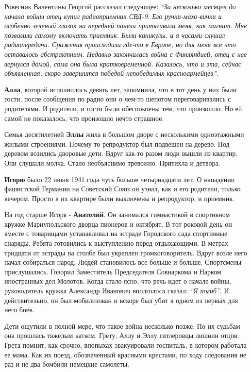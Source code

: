 Ровесник Валентины Георгий рассказал следующее: \emph{\enquote{За несколько месяцев до начала
войны отец купил радиоприемник СВД-9. Его ручки-махо\hyp{}вички и особенно зеленый
глазок на передней панели притягивали меня, как магнит. Мне позволили самому
включать приемник. Были каникулы, и я часами слушал радиопередачи. Сражения
происходили где-то в Европе, но для меня все это оставалось абстрактным.
Недавно закончилась война с Финляндией, отец с нее вернулся домой, сама она
была кратковременной. Казалось, что и эта, сейчас объявленная, скоро завершится
победой непобедимых красноармейцев}}.

\textbf{Алла}, которой исполнилось девять лет, запомнила, что в тот день у них были
гости, после сообщения по радио они о чем-то шепотом переговаривались с
родителями. И родители, и гости были обеспокоены тем, что произошло. Но ей
самой не показалось, что произошло нечто страшное.

Семья десятилетней \textbf{Эллы} жила в большом дворе с несколькими одноэтажными жилыми
строениями. Почему-то репродуктор был подвешен на дерево. Под деревом возились
дворовые дети. Вдруг как-то разом люди вышли из квартир. Они слушали молча.
Стало необъяснимо тревожно. Притихла и детвора.

\textbf{Игорю} было 22 июня 1941 года чуть больше четырнадцати лет. О нападении
фашистской Германии на Советский Союз он узнал, как и его родители, только
вечером. Просто в их квартире были выключены и репродуктор, и приемник. 

На год старше Игоря - \textbf{Анатолий}. Он занимался гимнастикой в спортивном кружке
Мариупольского дворца пионеров и октябрят. В тот роковой день он вместе с
товарищами устанавливал на эстраде Городского сада спортивные снаряды. Ребята
готовились к выступлению перед отдыхающими. В метрах тридцати от эстрады на
столбе был укреплен громкоговоритель. Вдруг возле него начал собираться народ.
Людей становилось все больше и больше. Спортсмены прислушались. Говорил
Заместитель Председателя Совнаркома и Нарком иностранных дел Молотов. Когда
стало ясно, что речь идет о начале войны, руководитель кружка Александр
Иванович вполголоса сказал: \emph{\enquote{Я погиб}}. И действительно, он был мобилизован и
вскоре был убит в одном из первых для него боев.

Дети ощутили в полной мере, что такое война несколько позже. По их судьбам она
прошлась тяжелым катком. Грету, Аллу и Эллу гитлеровцы лишили отцов. Грета
помнит, как срочно, впопыхах эвакуировали госпиталь, в котором работала ее
мама. Как их поезд, обозначенный красными крестами, по ходу следования не раз и
не два бомбили немецкие самолеты.

